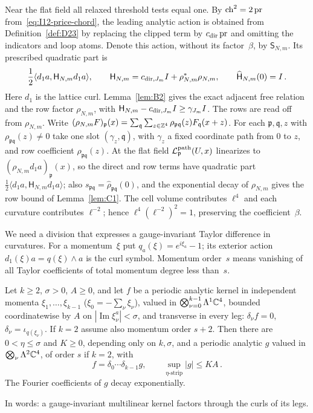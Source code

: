 Near the flat field all relaxed threshold tests equal one. By $\operatorname{ch}^2=2\operatorname{pr}$ from~\eqref{eq:I12-price-chord}, the leading analytic action is obtained from Definition~\ref{def:D23} by replacing the clipped term by $c_{\rm dir}\operatorname{pr}$ and omitting the indicators and loop atoms. Denote this action, without its factor~$\beta$, by $\mathsf S_{N,m}$. Its prescribed quadratic part is
\begin{equation*}
\frac12\langle d_1a,\mathsf H_{N,m}d_1a\rangle,
\qquad \mathsf H_{N,m}=c_{{\rm dir},J_m}I+\rho_{N,m}^*\rho_{N,m},
\qquad \widehat{\mathsf H}_{N,m}(0)=I\,.
\end{equation*}
Here $d_1$ is the lattice curl. Lemma~\ref{lem:B2} gives the exact adjacent free relation and the row factor $\rho_{N,m}$, with $\mathsf H_{N,m}-c_{{\rm dir},J_m}I\ge\gamma_{J_m}I$. The rows are read off from $\rho_{N,m}$. Write $(\rho_{N,m}F)_{\mathfrak p}(x)=\sum_{\mathfrak q}\sum_{z\in\mathbb{Z}^4}\rho_{\mathfrak p\mathfrak q}(z)F_{\mathfrak q}(x+z)$. For each $\mathfrak p,\mathfrak q,z$ with $\rho_{\mathfrak p\mathfrak q}(z)\ne0$ take one slot $(\gamma_z,\mathfrak q)$, with $\gamma_z$ a fixed coordinate path from $0$ to $z$, and row coefficient $\rho_{\mathfrak p\mathfrak q}(z)$. At the flat field $\mathcal L^{\rm path}_{\mathfrak p}(U,x)$ linearizes to $(\rho_{N,m}d_1a)_{\mathfrak p}(x)$, so the direct and row terms have quadratic part $\frac12\langle d_1a,\mathsf H_{N,m}d_1a\rangle$; also $s_{\mathfrak p\mathfrak q}=\widehat\rho_{\mathfrak p\mathfrak q}(0)$, and the exponential decay of $\rho_{N,m}$ gives the row bound of Lemma~\ref{lem:C1}. The cell volume contributes $\ell^4$ and each curvature contributes $\ell^{-2}$; hence $\ell^4(\ell^{-2})^2=1$, preserving the coefficient~$\beta$.

We need a division that expresses a gauge-invariant Taylor difference in curvatures. For a momentum~$\xi$ put $q_a(\xi)=e^{i\xi_a}-1$; its exterior action $d_1(\xi)a=q(\xi)\wedge a$ is the curl symbol. Momentum order~$s$ means vanishing of all Taylor coefficients of total momentum degree less than~$s$.

\begin{lemma}\label{lem:C3}
Let $k\ge2$, $\sigma>0$, $A\ge0$, and let $f$ be a periodic analytic kernel in independent momenta $\xi_1,\ldots,\xi_{k-1}$ ($\xi_0=-\sum_\nu\xi_\nu$), valued in $\bigotimes_{\nu=0}^{k-1}\Lambda^1\mathbb{C}^4$, bounded coordinatewise by $A$ on $|\operatorname{Im}\xi_\nu^a|<\sigma$, and transverse in every leg: $\delta_\nu f=0$, $\delta_\nu=\iota_{q(\xi_\nu)}$. If $k=2$ assume also momentum order $s+2$. Then there are $0<\eta\le\sigma$ and $K\ge0$, depending only on $k,\sigma$, and a periodic analytic $g$ valued in $\bigotimes_\nu\Lambda^2\mathbb{C}^4$, of order $s$ if $k=2$, with
\begin{equation*}
f=\delta_0\cdots\delta_{k-1}g,\qquad \sup_{\eta\text{-strip}}|g|\le KA\,.
\end{equation*}
The Fourier coefficients of $g$ decay exponentially.
\end{lemma}
In words: a gauge-invariant multilinear kernel factors through the curls of its legs.

